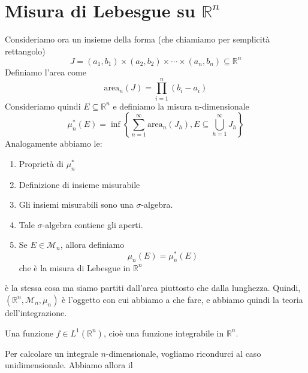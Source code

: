 \documentclass[a4paper]{article}
\begin{document}
\section{Misura di Lebesgue su \(\mathbb{R}^n\)}

Consideriamo ora un insieme della forma (che chiamiamo per semplicità rettangolo)
\[
    J = (a_1, b_1) \times (a_2, b_2) \times \cdots \times (a_n, b_n) \subseteq {\mathbb{R}}^n
\]
Definiamo l'area come
\[
    \text{area}_n(J) = \prod_{i=1}^n (b_i-a_i)
\]
Consideriamo quindi \(E \subseteq \mathbb{R}^n\) e definiamo la misura n-dimensionale
\[
    \mu_n^*(E) = \inf\left\{
        \sum_{n=1}^\infty \text{area}_n (J_h), E \subseteq \bigcup_{h=1}^\infty J_h
    \right\}
\]
Analogamente abbiamo le:
\begin{enumerate}
    \item Proprietà di \(\mu_n^*\)
    \item Definizione di insieme misurabile
    \item Gli insiemi misurabili sono una \(\sigma\)-algebra.
    \item Tale \(\sigma\)-algebra contiene gli aperti.
    \item Se \(E \in \mathcal{M}_n\), allora definiamo
    \[
        \mu_n(E) = \mu_n^*(E)
    \]
    che è la misura di Lebesgue in \({\mathbb{R}}^n\)
\end{enumerate}
è la stessa cosa ma siamo partiti dall'area piuttosto che dalla lunghezza.
Quindi, \(({\mathbb{R}}^n, {\mathcal{M}}_n, \mu_n)\) è l'oggetto con cui abbiamo a che fare,
e abbiamo quindi la teoria dell'integrazione.

Una funzione \(f\in L^1({\mathbb{R}}^n)\),
cioè una funzione integrabile in \({\mathbb{R}}^n\).

\pagebreak

Per calcolare un integrale \(n\)-dimensionale, vogliamo ricondurci al caso unidimensionale. Abbiamo allora il
\end{document}
